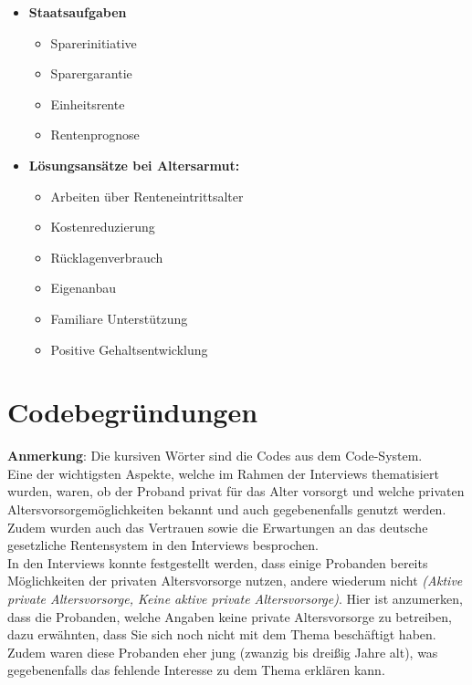 \documentclass{hsflensburg}
\begin{document}
\begin{itemize}
\begin{itemize}
\begin{itemize}
	\end{itemize}

	\item \textbf{Staatsaufgaben}
	\begin{itemize}
	\item Sparerinitiative
	\item Sparergarantie
	\item Einheitsrente
	\item Rentenprognose
	\end{itemize}

	\item \textbf{Lösungsansätze bei Altersarmut:}
	\begin{itemize}
	\item Arbeiten über Renteneintrittsalter
	\item Kostenreduzierung
	\item Rücklagenverbrauch
	\item Eigenanbau
	\item Familiare Unterstützung
	\item Positive Gehaltsentwicklung
	\end{itemize}

	\end{itemize}
	\end{itemize}

	\pagebreak

	\section{Codebegründungen}

	\textbf{Anmerkung}: Die kursiven Wörter sind die Codes aus dem Code-System. \\

	Eine der wichtigsten Aspekte, welche im Rahmen der Interviews thematisiert wurden, waren, ob der Proband privat für das Alter
	vorsorgt und welche privaten Altersvorsorgemöglichkeiten bekannt und auch gegebenenfalls genutzt werden. Zudem wurden auch 
	das Vertrauen sowie die Erwartungen an das deutsche gesetzliche Rentensystem in den Interviews besprochen. \\

	In den Interviews konnte festgestellt werden, dass einige Probanden bereits Möglichkeiten der privaten Altersvorsorge nutzen,
	andere wiederum nicht \textit{(Aktive private Altersvorsorge, Keine aktive private Altersvorsorge)}. Hier ist anzumerken,
	dass die Probanden, welche Angaben keine private Altersvorsorge zu betreiben, dazu erwähnten, dass Sie sich noch nicht
	mit dem Thema beschäftigt haben. Zudem waren diese Probanden eher jung (zwanzig bis dreißig Jahre alt), was gegebenenfalls
	das fehlende Interesse zu dem Thema erklären kann. \\
	
\end{document}
